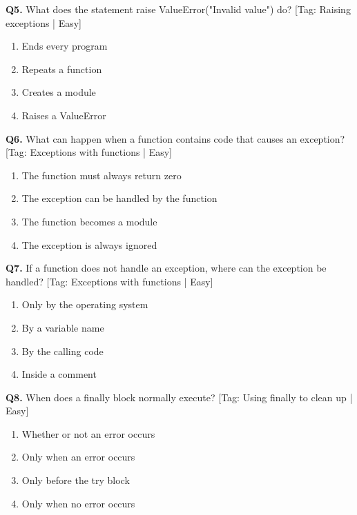 \vspace{2mm}
\noindent\textbf{Q5.} What does the statement raise ValueError("Invalid value") do? \hfill [Tag: Raising exceptions | Easy]
\begin{enumerate}[label=(\alph*),topsep=2pt,itemsep=1pt,partopsep=0pt,parsep=0pt]
    \item {Ends every program}
    \item {Repeats a function}
    \item {Creates a module}
    \item {Raises a ValueError}
\end{enumerate}
\vspace{2mm}
\noindent\textbf{Q6.} What can happen when a function contains code that causes an exception? \hfill [Tag: Exceptions with functions | Easy]
\begin{enumerate}[label=(\alph*),topsep=2pt,itemsep=1pt,partopsep=0pt,parsep=0pt]
    \item {The function must always return zero}
    \item {The exception can be handled by the function}
    \item {The function becomes a module}
    \item {The exception is always ignored}
\end{enumerate}
\vspace{2mm}
\noindent\textbf{Q7.} If a function does not handle an exception, where can the exception be handled? \hfill [Tag: Exceptions with functions | Easy]
\begin{enumerate}[label=(\alph*),topsep=2pt,itemsep=1pt,partopsep=0pt,parsep=0pt]
    \item {Only by the operating system}
    \item {By a variable name}
    \item {By the calling code}
    \item {Inside a comment}
\end{enumerate}
\vspace{2mm}
\noindent\textbf{Q8.} When does a finally block normally execute? \hfill [Tag: Using finally to clean up | Easy]
\begin{enumerate}[label=(\alph*),topsep=2pt,itemsep=1pt,partopsep=0pt,parsep=0pt]
    \item {Whether or not an error occurs}
    \item {Only when an error occurs}
    \item {Only before the try block}
    \item {Only when no error occurs}
\end{enumerate}
